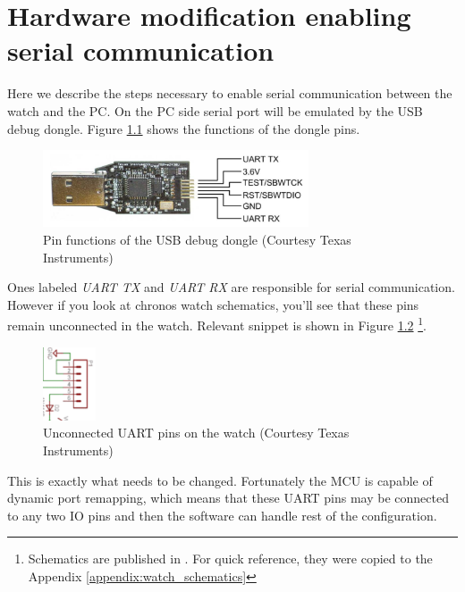 \chapter{Hardware modification enabling serial communication}
\label{appendix:uart_pins}

Here we describe the steps necessary to enable serial communication
between the watch and the PC. On the PC side serial port will be
emulated by the USB debug dongle. Figure \ref{fig:chronos_dongle_pins}
shows the functions of the dongle pins.
\begin{figure}[h]
  \centering
  \includegraphics[width=0.7\textwidth]{img/chronos_dongle_pins.png}
  \caption{Pin functions of the USB debug dongle (Courtesy Texas Instruments)}
  \label{fig:chronos_dongle_pins}
\end{figure}
Ones labeled \emph{UART TX} and \emph{UART RX} are responsible for
serial communication. However if you look at chronos watch schematics,
you'll see that these pins remain unconnected in the watch. Relevant
snippet is shown in Figure \ref{fig:chronos_unonnected_uart}
\footnote{Schematics are published in \cite{eZ430Chronos}. For quick
reference, they were copied to the Appendix
\ref{appendix:watch_schematics}}.
\begin{figure}[h]
  \centering
  \includegraphics[width=0.14\textwidth]{img/chronos_unonnected_uart.png}
  \caption{Unconnected UART pins on the watch (Courtesy Texas Instruments)}
  \label{fig:chronos_unonnected_uart}
\end{figure}
This is exactly what needs to be changed. Fortunately the MCU is
capable of dynamic port remapping, which means that these UART pins may
be connected to any two IO pins and then the software can handle rest of the
configuration.

